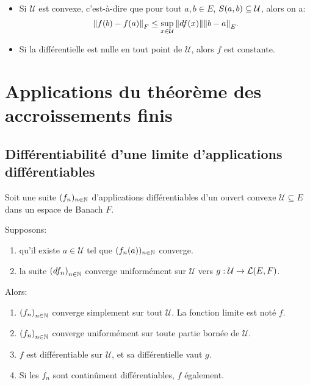 \begin{remarque}
	\begin{itemize}
		\item Si $\mathcal{U}$ est convexe, c'est-à-dire que pour tout $a, b \in
			E$, $S(a, b) \subseteq \mathcal{U}$, alors on a:
			\begin{equation*}
				\norm{f(b) - f(a)}_{F} \leq \displaystyle \sup_{x \in \mathcal{U}}
				\norm{df(x)} \norm{b - a}_{E}.
			\end{equation*}
		\item Si la différentielle est nulle en tout point de $\mathcal{U}$,
			alors $f$ est constante.
	\end{itemize}
\end{remarque}

\section{Applications du théorème des accroissements finis}

\subsection{Différentiabilité d'une limite d'applications différentiables}

\begin{corollary}
	Soit une suite $(f_{n})_{n \in \mathbb{N}}$ d'applications différentiables d'un ouvert convexe
	$\mathcal{U} \subseteq E$ dans un espace de Banach $F$.

	Supposons:
	\begin{enumerate}
		\item qu'il existe $a \in \mathcal{U}$ tel que $(f_{n}(a))_{n \in
			\mathbb{N}}$ converge.
		\item la suite ${(df_{n})}_{n \in \mathbb{N}}$ converge uniformément sur
			$\mathcal{U}$ vers
			$g : \mathcal{U} \rightarrow \mathcal{L}(E, F)$.
	\end{enumerate}

	Alors:

	\begin{enumerate}
		\item ${(f_{n})}_{n \in \mathbb{N}}$ converge simplement sur tout
			$\mathcal{U}$. La fonction limite est noté $f$.
		\item ${(f_{n})}_{n \in \mathbb{N}}$ converge uniformément sur toute
			partie bornée de $\mathcal{U}$.
		\item $f$ est différentiable sur $\mathcal{U}$, et sa différentielle
			vaut $g$.
		\item Si les $f_{n}$ sont continûment différentiables, $f$ également.
	\end{enumerate}
\end{corollary}

